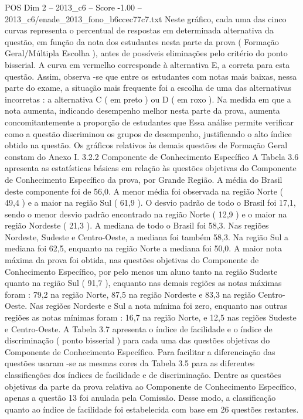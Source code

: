 \begin{textsample}{POS Dim 2 – 2013\_c6 – Score -1.00 – 2013\_c6/enade\_2013\_fono\_b6ccec77c7.txt}
Neste gráfico, cada uma das cinco curvas representa o percentual de respostas em determinada alternativa da questão, em função da nota dos estudantes nesta parte da prova ( Formação Geral/Múltipla Escolha ), antes de possíveis eliminações pelo critério do ponto bisserial.
A curva em vermelho corresponde à alternativa E, a correta para esta questão.
Assim, observa -se que entre os estudantes com notas mais baixas, nessa parte do exame, a situação mais frequente foi a escolha de uma das alternativas incorretas : a alternativa C ( em preto ) ou D ( em roxo ).
Na medida em que a nota aumenta, indicando desempenho melhor nesta parte da prova, aumenta concomitantemente a proporção de estudantes que Essa análise permite verificar como a questão discriminou os grupos de desempenho, justificando o alto índice obtido na questão.
Os gráficos relativos às demais questões de Formação Geral constam do Anexo I. 3.2.2 Componente de Conhecimento Específico A Tabela 3.6 apresenta as estatísticas básicas em relação às questões objetivas do Componente de Conhecimento Específico da prova, por Grande Região.
A média do Brasil deste componente foi de 56,0.
A menor média foi observada na região Norte ( 49,4 ) e a maior na região Sul ( 61,9 ).
O desvio padrão de todo o Brasil foi 17,1, sendo o menor desvio padrão encontrado na região Norte ( 12,9 ) e o maior na região Nordeste ( 21,3 ).
A mediana de todo o Brasil foi 58,3.
Nas regiões Nordeste, Sudeste e Centro-Oeste, a mediana foi também 58,3.
Na região Sul a mediana foi 62,5, enquanto na região Norte a mediana foi 50,0.
A maior nota máxima da prova foi obtida, nas questões objetivas do Componente de Conhecimento Específico, por pelo menos um aluno tanto na região Sudeste quanto na região Sul ( 91,7 ), enquanto nas demais regiões as notas máximas foram : 79,2 na região Norte, 87,5 na região Nordeste e 83,3 na região Centro-Oeste.
Nas regiões Nordeste e Sul a nota mínima foi zero, enquanto nas outras regiões as notas mínimas foram : 16,7 na região Norte, e 12,5 nas regiões Sudeste e Centro-Oeste.
A Tabela 3.7 apresenta o índice de facilidade e o índice de discriminação ( ponto bisserial ) para cada uma das questões objetivas do Componente de Conhecimento Específico.
Para facilitar a diferenciação das questões usaram -se as mesmas cores da Tabela 3.5 para as diferentes classificações dos índices de facilidade e de discriminação.
Dentre as questões objetivas da parte da prova relativa ao Componente de Conhecimento Específico, apenas a questão 13 foi anulada pela Comissão.
Desse modo, a classificação quanto ao índice de facilidade foi estabelecida com base em 26 questões restantes.

\end{textsample}
